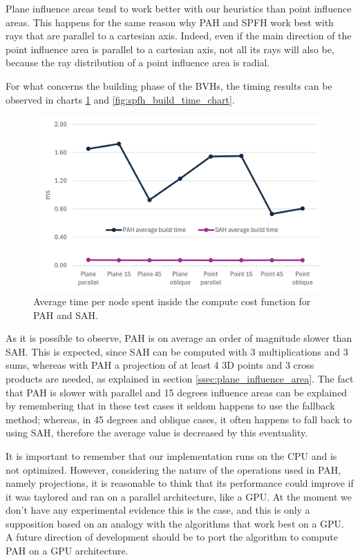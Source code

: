 \documentclass{PoliMi_MasterThesis}
\begin{document}
Plane influence areas tend to work better with our heuristics than point influence areas. This happens for the same reason why PAH and SPFH work best with rays that are parallel to a cartesian axis. Indeed, even if the main direction of the point influence area is parallel to a cartesian axis, not all its rays will also be, because the ray distribution of a point influence area is radial.

For what concerns the building phase of the BVHs, the timing results can be observed in charts \ref{fig:pah_build_time_chart} and \ref{fig:spfh_build_time_chart}.

\begin{figure}[H] 
	\includegraphics[width=\textwidth]{Images/pah_build_time_chart.png}
	\caption{Average time per node spent inside the compute cost function for PAH and SAH.}
	\label{fig:pah_build_time_chart}
\end{figure}

As it is possible to observe, PAH is on average an order of magnitude slower than SAH. This is expected, since SAH can be computed with 3 multiplications and 3 sums, whereas with PAH a projection of at least 4 3D points and 3 cross products are needed, as explained in section \ref{ssec:plane_influence_area}. The fact that PAH is slower with parallel and 15 degrees influence areas can be explained by remembering that in these test cases it seldom happens to use the fallback method; whereas, in 45 degrees and oblique cases, it often happens to fall back to using SAH, therefore the average value is decreased by this eventuality.

It is important to remember that our implementation runs on the CPU and is not optimized. However, considering the nature of the operations used in PAH, namely projections, it is reasonable to think that its performance could improve if it was taylored and ran on a parallel architecture, like a GPU. At the moment we don't have any experimental evidence this is the case, and this is only a supposition based on an analogy with the algorithms that work best on a GPU. A future direction of development should be to port the algorithm to compute PAH on a GPU architecture.
\end{document}
